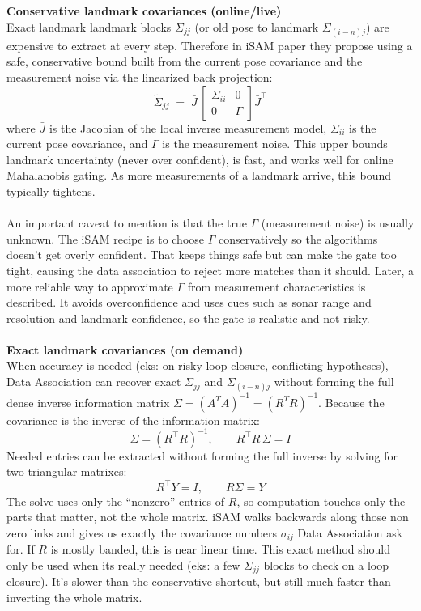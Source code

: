 \noindent
\textbf{Conservative landmark covariances (online/live)} 
\\ \noindent
Exact landmark landmark blocks $\Sigma_{jj}$ (or old pose to landmark $\Sigma_{(i-n)j}$) are expensive to extract at every step. Therefore in iSAM paper \cite{iSAM_paper} they propose using a safe, conservative bound built from the current pose covariance and the measurement noise via the linearized back projection:
$$
    \tilde\Sigma_{jj}
    \;=\;
    \bar J\,
    \begin{bmatrix}
    \Sigma_{ii} & 0\\[2pt]
    0 & \Gamma
    \end{bmatrix}
    \bar J^\top
$$
where $\bar J$ is the Jacobian of the local inverse measurement model, $\Sigma_{ii}$ is the current pose covariance, and $\Gamma$ is the measurement noise. This upper bounds landmark uncertainty (never over confident), is fast, and works well for online Mahalanobis gating. As more measurements of a landmark arrive, this bound typically tightens.
\\ \\
An important caveat to mention is that the true $\Gamma$ (measurement noise) is usually unknown. The iSAM recipe is to choose $\Gamma$ conservatively so the algorithms doesn't get overly confident. That keeps things safe but can make the gate too tight, causing the data association to reject more matches than it should. Later, a more reliable way to approximate $\Gamma$ from measurement characteristics is described. It avoids overconfidence and uses cues such as sonar range and resolution and landmark confidence, so the gate is realistic and not risky.
\\ \\
\textbf{Exact landmark covariances (on demand)} 
\\ \noindent
When accuracy is needed (eks: on risky loop closure, conflicting hypotheses), Data Association can recover exact $\Sigma_{jj}$ and $\Sigma_{(i-n)j}$ without forming the full dense inverse information matrix $\Sigma=(A^{T}A)^{-1}=(R^{T}R)^{-1}$. Because the covariance is the inverse of the information matrix:
$$
    \Sigma=(R^\top R)^{-1}, \qquad R^\top R\,\Sigma = I
$$
Needed entries can be extracted without forming the full inverse by solving for two triangular matrixes:
$$
R^\top Y = I, \qquad R \Sigma = Y
$$
The solve uses only the ``nonzero'' entries of $R$, so computation touches only the parts that matter, not the whole matrix. iSAM walks backwards along those non zero links and gives us exactly the covariance numbers $\sigma_{ij}$ Data Association ask for. If $R$ is mostly banded, this is near linear time. This exact method should only be used when its really needed (eks: a few $\Sigma_{jj}$ blocks to check on a loop closure). It's slower than the conservative shortcut, but still much faster than inverting the whole matrix.
